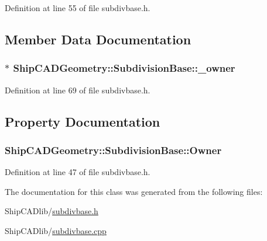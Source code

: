 Definition at line 55 of file subdivbase.\-h.



\subsection{Member Data Documentation}
\hypertarget{classShipCADGeometry_1_1SubdivisionBase_a5a9ce820f644a1ecd9ddb802270f31a9}{
\subsubsection[{\-\_\-owner}]{$\ast$ Ship\-C\-A\-D\-Geometry\-::\-Subdivision\-Base\-::\-\_\-owner\hspace{0.3cm}{\ttfamily [protected]}}}\label{classShipCADGeometry_1_1SubdivisionBase_a5a9ce820f644a1ecd9ddb802270f31a9}


Definition at line 69 of file subdivbase.\-h.



\subsection{Property Documentation}
\hypertarget{classShipCADGeometry_1_1SubdivisionBase_af3adf1c6df9fd4ddb5c945193fe5c65e}{
\subsubsection[{Owner}]{ Ship\-C\-A\-D\-Geometry\-::\-Subdivision\-Base\-::\-Owner\hspace{0.3cm}{\ttfamily [read]}}}\label{classShipCADGeometry_1_1SubdivisionBase_af3adf1c6df9fd4ddb5c945193fe5c65e}


Definition at line 47 of file subdivbase.\-h.



The documentation for this class was generated from the following files\-:\begin{DoxyCompactItemize}
\item 
Ship\-C\-A\-Dlib/\hyperlink{subdivbase_8h}{subdivbase.\-h}\item 
Ship\-C\-A\-Dlib/\hyperlink{subdivbase_8cpp}{subdivbase.\-cpp}\end{DoxyCompactItemize}
